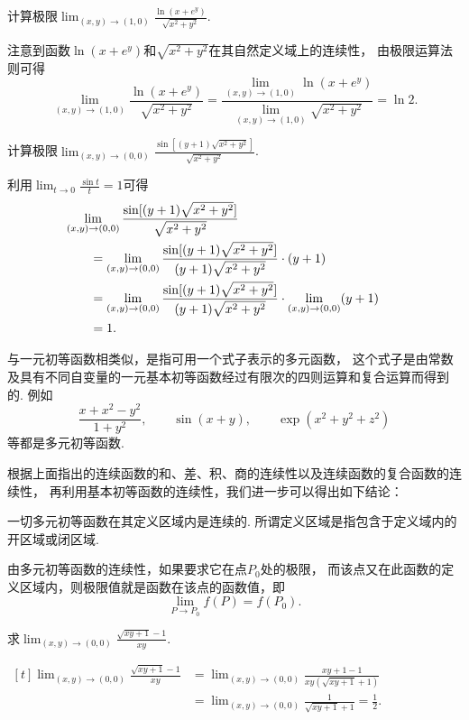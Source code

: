 \begin{example}
计算极限\(\lim_{(x,y)\to(1,0)} \frac{\ln(x+e^y)}{\sqrt{x^2+y^2}}\).
\begin{solution}
注意到函数\(\ln(x+e^y)\)和\(\sqrt{x^2+y^2}\)在其自然定义域上的连续性，
由极限运算法则可得\[
	\lim_{(x,y)\to(1,0)} \frac{\ln(x+e^y)}{\sqrt{x^2+y^2}}
	= \frac{\lim\limits_{(x,y)\to(1,0)} \ln(x+e^y)}
		{\lim\limits_{(x,y)\to(1,0)} \sqrt{x^2+y^2}}
	= \ln2.
\]
\end{solution}
\end{example}
\begin{example}
计算极限\(\lim_{(x,y)\to(0,0)} \frac{\sin[(y+1)\sqrt{x^2+y^2}]}{\sqrt{x^2+y^2}}\).
\begin{solution}
利用\(\lim_{t\to0} \frac{\sin t}{t} = 1\)可得\begin{align*}
	&\hspace{-20pt}
	\lim_{(x,y)\to(0,0)} \frac{\sin[(y+1)\sqrt{x^2+y^2}]}{\sqrt{x^2+y^2}} \\
	&= \lim_{(x,y)\to(0,0)} \frac{\sin[(y+1)\sqrt{x^2+y^2}]}{(y+1)\sqrt{x^2+y^2}}\cdot(y+1) \\
	&= \lim_{(x,y)\to(0,0)} \frac{\sin[(y+1)\sqrt{x^2+y^2}]}{(y+1)\sqrt{x^2+y^2}}
		\cdot \lim_{(x,y)\to(0,0)} (y+1) \\
	&= 1.
\end{align*}
\end{solution}
\end{example}

与一元初等函数相类似，是指可用一个式子表示的多元函数，
这个式子是由常数及具有不同自变量的一元基本初等函数经过有限次的四则运算和复合运算而得到的.
例如\[
	\frac{x+x^2-y^2}{1+y^2},
	\qquad
	\sin(x+y),
	\qquad
	\exp(x^2+y^2+z^2)
\]等都是多元初等函数.

根据上面指出的连续函数的和、差、积、商的连续性以及连续函数的复合函数的连续性，
再利用基本初等函数的连续性，我们进一步可以得出如下结论：

一切多元初等函数在其定义区域内是连续的.
所谓定义区域是指包含于定义域内的开区域或闭区域.

由多元初等函数的连续性，如果要求它在点\(P_0\)处的极限，
而该点又在此函数的定义区域内，则极限值就是函数在该点的函数值，即\[
	\lim_{P \to P_0} f(P) = f(P_0).
\]

\begin{example}
\def\l{\lim_{(x,y)\to(0,0)}}
求\(\l \frac{\sqrt{xy+1}-1}{xy}\).
\begin{solution}
\(\begin{aligned}[t]
\l \frac{\sqrt{xy+1}-1}{xy}
&= \l \frac{xy+1-1}{xy(\sqrt{xy+1}+1)} \\
&= \l \frac{1}{\sqrt{xy+1}+1}
= \frac{1}{2}.
\end{aligned}\)
\end{solution}
\end{example}


